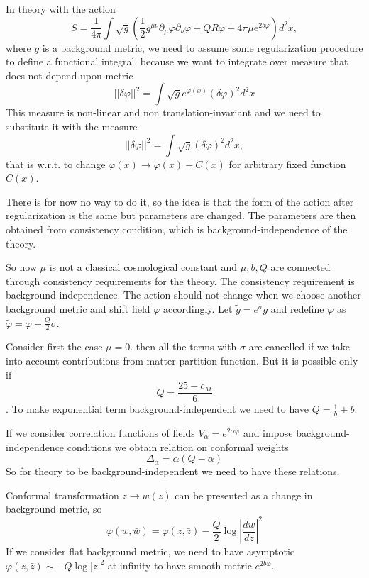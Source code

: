 \documentclass[12pt]{article}
\begin{document}
In theory with the action
$$S=\frac{1}{4\pi} \int \sqrt{g}\left( \frac{1}{2} g^{\mu\nu} \partial_{\mu} \varphi \partial_{\nu}
  \varphi + Q R\varphi + 4\pi\mu e^{2b\varphi}\right) d^{2}x,$$ 
where $g$ is a background metric, we need to assume some regularization procedure to define a
functional integral, because we want to integrate over measure that does not depend upon metric
\begin{equation}
  \label{eq:114}
  ||\delta\varphi||^{2}=\int \sqrt{g} e^{\varphi(x)}(\delta\varphi)^{2} d^{2}x
\end{equation}
This measure is non-linear and non translation-invariant and we need to substitute it with the
measure
\begin{equation}
  \label{eq:115}
    ||\delta\varphi||^{2}=\int \sqrt{g}(\delta\varphi)^{2} d^{2}x,
\end{equation}
that is  w.r.t. to change $\varphi(x)\to \varphi(x) +C(x)$ for arbitrary fixed function $C(x)$. 

There is for now no way to do it, so 
the idea is that the form of the action after regularization is the same but parameters are changed.
The parameters are then obtained from consistency condition, which is background-independence of the
theory. 

So now $\mu$ is not a classical cosmological constant and $\mu,b,Q$ are connected through
consistency requirements for the theory. 
The consistency requirement is background-independence. The action should not change when we choose
another background metric and shift field $\varphi$ accordingly. 
Let $\tilde g = e^{\sigma} g$ and redefine $\varphi$ as $\tilde \varphi=\varphi +
\frac{Q}{2}\sigma$. 

Consider first the case $\mu=0$.
then all the terms with $\sigma$ are cancelled if we take into account contributions from matter
partition function. But it is possible only if 
$$Q=\frac{25-c_{M}}{6}$$. 
To make exponential term background-independent we need to have $Q=\frac{1}{b}+b$. 

If we consider correlation functions of fields $V_{\alpha}=e^{2\alpha\varphi}$ and impose
background-independence conditions we obtain relation on conformal weights
$$\Delta_{\alpha}=\alpha(Q-\alpha)$$
So for theory to be background-independent we need to have these relations. 

Conformal transformation $z\to w(z)$ can be presented as a change in background metric, so 
$$\varphi(w,\bar w) = \varphi(z,\bar z) -\frac{Q}{2}\log \left|\frac{dw}{dz}\right|^{2}$$
If we consider flat background metric, we need to have asymptotic $\varphi(z,\bar z)\sim -Q \log
|z|^{2}$ at infinity to have smooth metric $e^{2b\varphi}$. 
\end{document}
